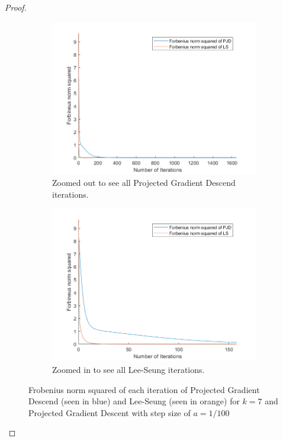 \documentclass[12pt]{report}
\begin{document}
\begin{problem}
\begin{proof}
\begin{figure}[H]
    \begin{subfigure}[b]{0.5\linewidth}
        \centering
        \includegraphics[width=\linewidth]{images/k7l.png}
        \caption{Zoomed out to see all Projected Gradient Descend iterations.}
        \label{fig2:a}
        \vspace{4ex}
    \end{subfigure}%
    \begin{subfigure}[b]{0.5\linewidth}
        \centering
        \includegraphics[width=\linewidth]{images/k7s.png}
        \caption{Zoomed in to see all Lee-Seung iterations.}
        \label{fig2:b}
        \vspace{4ex}
    \end{subfigure}
    \caption{Frobenius norm squared of each iteration of Projected Gradient Descend (seen in blue) and Lee-Seung (seen in orange) for $k=7$ and Projected Gradient Descent with step size of $a=1/100$}
    \label{fig2}
\end{figure}


\end{proof}
\end{problem}
\end{document}
